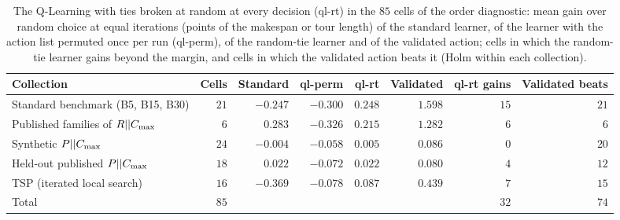 \begin{table}[t]
\caption{The Q-Learning with ties broken at random at every decision (ql-rt) in the $85$ cells of the order diagnostic: mean gain over random choice at equal iterations (points of the makespan or tour length) of the standard learner, of the learner with the action list permuted once per run (ql-perm), of the random-tie learner and of the validated action; cells in which the random-tie learner gains beyond the margin, and cells in which the validated action beats it (Holm within each collection).}
\label{tab:ties}
\centering
{\scriptsize\setlength{\tabcolsep}{3.5pt}
\begin{tabular}{@{}lrrrrrrr@{}}
\toprule
Collection & Cells & Standard & ql-perm & ql-rt & Validated & ql-rt gains & Validated beats \\
\midrule
Standard benchmark (B5, B15, B30) & $21$ & $-0.247$ & $-0.300$ & $0.248$ & $1.598$ & $15$ & $21$ \\
Published families of $R||C_{\max}$ & $6$ & $0.283$ & $-0.326$ & $0.215$ & $1.282$ & $6$ & $6$ \\
Synthetic $P||C_{\max}$ & $24$ & $-0.004$ & $-0.058$ & $0.005$ & $0.086$ & $0$ & $20$ \\
Held-out published $P||C_{\max}$ & $18$ & $0.022$ & $-0.072$ & $0.022$ & $0.080$ & $4$ & $12$ \\
TSP (iterated local search) & $16$ & $-0.369$ & $-0.078$ & $0.087$ & $0.439$ & $7$ & $15$ \\
\midrule
Total & $85$ & & & & & $32$ & $74$ \\
\bottomrule
\end{tabular}}
\end{table}
